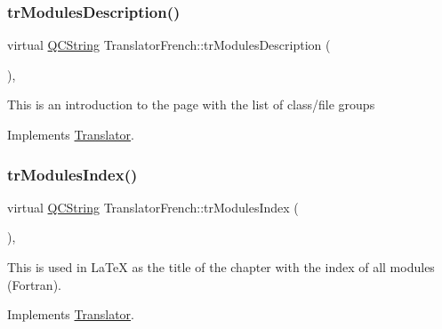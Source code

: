 \mbox{\label{class_translator_french_ac343924bfe53b1d0a25da907fd50d2c6}} 
\subsubsection{\texorpdfstring{trModulesDescription()}{trModulesDescription()}}
{\footnotesize\ttfamily virtual \mbox{\hyperlink{class_q_c_string}{Q\+C\+String}} Translator\+French\+::tr\+Modules\+Description (\begin{DoxyParamCaption}{ }\end{DoxyParamCaption})\hspace{0.3cm}{\ttfamily [inline]}, {\ttfamily [virtual]}}

This is an introduction to the page with the list of class/file groups 

Implements \mbox{\hyperlink{class_translator}{Translator}}.

\mbox{\label{class_translator_french_a2bc7b503c21d83ea0cc9bb7da53c8f07}} 
\subsubsection{\texorpdfstring{trModulesIndex()}{trModulesIndex()}}
{\footnotesize\ttfamily virtual \mbox{\hyperlink{class_q_c_string}{Q\+C\+String}} Translator\+French\+::tr\+Modules\+Index (\begin{DoxyParamCaption}{ }\end{DoxyParamCaption})\hspace{0.3cm}{\ttfamily [inline]}, {\ttfamily [virtual]}}

This is used in La\+TeX as the title of the chapter with the index of all modules (Fortran). 

Implements \mbox{\hyperlink{class_translator}{Translator}}.

\mbox{\label{class_translator_french_a4238f81b8be85bab7031d1ff766b005d}} 

